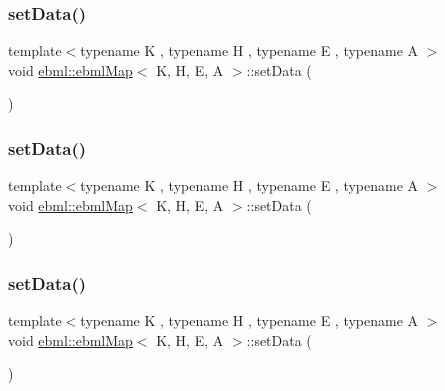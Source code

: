 \subsubsection{\texorpdfstring{set\+Data()}{setData()}\hspace{0.1cm}{\footnotesize\ttfamily [6/11]}}
{\footnotesize\ttfamily template$<$typename K , typename H , typename E , typename A $>$ \\
void \mbox{\hyperlink{classebml_1_1ebmlMap}{ebml\+::ebml\+Map}}$<$ K, H, E, A $>$\+::set\+Data (\begin{DoxyParamCaption}\item[{const std\+::list$<$ std\+::pair$<$ K, \mbox{\hyperlink{namespaceebml_adad533b7705a16bb360fe56380c5e7be}{ebml\+Element\+\_\+sp}} $>$$>$ \&}]{ }\end{DoxyParamCaption})}

\mbox{\label{classebml_1_1ebmlMap_aa8168bc50460fb4e3cd704d16dcd071e}} 
\subsubsection{\texorpdfstring{set\+Data()}{setData()}\hspace{0.1cm}{\footnotesize\ttfamily [7/11]}}
{\footnotesize\ttfamily template$<$typename K , typename H , typename E , typename A $>$ \\
void \mbox{\hyperlink{classebml_1_1ebmlMap}{ebml\+::ebml\+Map}}$<$ K, H, E, A $>$\+::set\+Data (\begin{DoxyParamCaption}\item[{std\+::list$<$ \mbox{\hyperlink{namespaceebml_adad533b7705a16bb360fe56380c5e7be}{ebml\+Element\+\_\+sp}} $>$ \&\&}]{ }\end{DoxyParamCaption})}

\mbox{\label{classebml_1_1ebmlMap_aa3a6c46cc3c149337ffbbb796574e11d}} 
\subsubsection{\texorpdfstring{set\+Data()}{setData()}\hspace{0.1cm}{\footnotesize\ttfamily [8/11]}}
{\footnotesize\ttfamily template$<$typename K , typename H , typename E , typename A $>$ \\
void \mbox{\hyperlink{classebml_1_1ebmlMap}{ebml\+::ebml\+Map}}$<$ K, H, E, A $>$\+::set\+Data (\begin{DoxyParamCaption}\item[{std\+::list$<$ std\+::pair$<$ \mbox{\hyperlink{namespaceebml_adad533b7705a16bb360fe56380c5e7be}{ebml\+Element\+\_\+sp}}, \mbox{\hyperlink{namespaceebml_adad533b7705a16bb360fe56380c5e7be}{ebml\+Element\+\_\+sp}} $>$$>$ \&\&}]{ }\end{DoxyParamCaption})}

